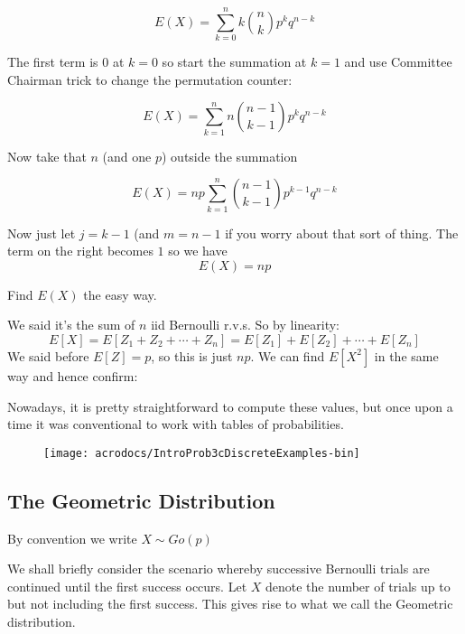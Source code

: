 \documentclass[12pt]{extbook}
\begin{document}
\begin{displaymath}
E(X) = \sum_{k=0}^n k \binom{n}{k} p^k q^{n-k}
\end{displaymath}

The first term is $0$ at $k=0$ so start the summation at $k=1$ and use Committee Chairman trick to change the permutation counter:

\begin{displaymath}
E(X) = \sum_{k=1}^n  n \binom{n-1}{k-1} p^k q^{n-k} 
\end{displaymath}

Now take that $n$ (and one $p$) outside the summation

\begin{displaymath}
E(X) = np \sum_{k=1}^n   \binom{n-1}{k-1} p^{k-1}q^{n-k}
\end{displaymath}

Now just let $j=k-1$ (and $m=n-1$ if you worry about that sort of thing.   The term on the right becomes $1$ so we have
\begin{displaymath}
E(X) = np
\end{displaymath}



Find $E(X)$ the easy way.

We said it's the sum of $n$ iid Bernoulli r.v.s.   So by linearity:
\begin{displaymath}
E[X] = E[Z_1 + Z_2 + \cdots + Z_n] = E[Z_1] + E[Z_2] + \cdots + E[Z_n]
\end{displaymath}
We said before $E[Z] = p$, so this is just $np$.   We can find $E[X^2]$ in the same way and hence confirm:



Nowadays, it is pretty straightforward to compute these values, but
once upon a time it was conventional to work with tables of
probabilities.  
\begin{figure}
\texttt{[image: acrodocs/IntroProb3cDiscreteExamples-bin]}
\end{figure}

\clearpage

\subsection{The Geometric Distribution}

{\color{green} By convention we write $X \sim Go(p)$} 

We shall briefly consider the scenario whereby successive Bernoulli trials are continued until the first success occurs.   Let $X$ denote the number of trials up to but not including the first success.   This gives rise to what we call the Geometric distribution.   
\end{document}
